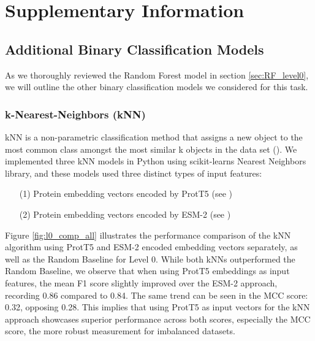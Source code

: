 \documentclass{bioinfo}
\begin{document}
\section{Supplementary Information}

\subsection{Additional Binary Classification Models}\label{sec:unused binarys}
As we thoroughly reviewed the Random Forest model in section \ref{sec:RF_level0}, we will outline the other binary classification models we considered for this task.

\subsubsection{k-Nearest-Neighbors (kNN)}
kNN is a non-parametric classification method
that assigns a new object to the most common class amongst the most similar k objects in the data set (\cite{knn_principles}). We implemented three kNN models in Python using scikit-learns Nearest Neighbors library, and 
these models used three distinct types of input features:
\begin{enumerate}
	\item[(1)] Protein embedding vectors encoded by ProtT5 (see \cite{ProtT5})
    \item[(2)] Protein embedding vectors encoded by ESM-2 (see \cite{ESM2})
\end{enumerate}
Figure \ref{fig:l0_comp_all} illustrates the performance comparison of the kNN algorithm using ProtT5 and ESM-2 encoded
embedding vectors separately, as well as the Random Baseline for Level 0.
While both kNNs outperformed the Random Baseline, we observe that when using ProtT5 embeddings as input features, 
the mean F1 score slightly improved over the ESM-2 approach, recording 0.86 compared to 0.84.
The same trend can be seen in the MCC score: 0.32, opposing 0.28. 
This implies that using ProtT5 as input vectors for the kNN approach showcases superior performance across both scores, 
especially the MCC score, the more robust measurement for imbalanced datasets. 
\end{document}
